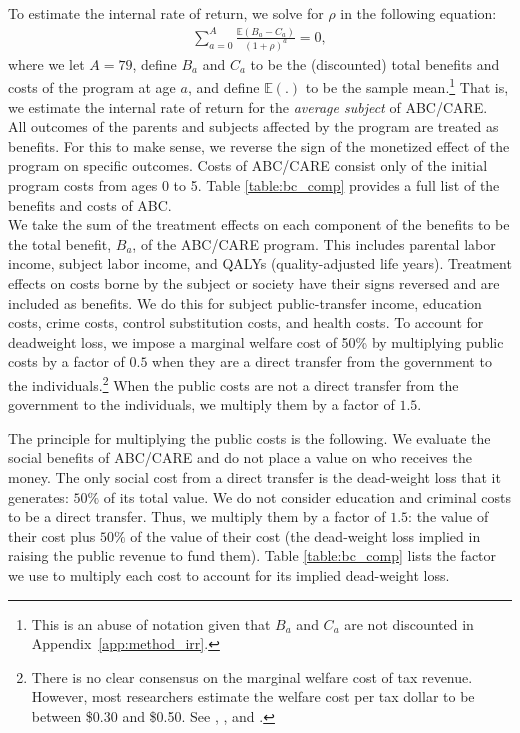 \noindent To estimate the internal rate of return, we solve for $\rho$ in the following equation:
\begin{align}
\sum_{a=0}^A \frac{ \mathbb{E} (B_a - C_a)}{(1+\rho)^a} = 0,
\end{align}
where we let $A = 79$, define $B_a$ and $C_a$ to be the (discounted) total benefits and costs of the program at age $a$, and define $\mathbb{E}(.)$ to be the sample mean.\footnote{This is an abuse of notation given that $B_a$ and $C_a$ are not discounted in Appendix~\ref{app:method_irr}.} That is, we estimate the internal rate of return for the \textit{average subject} of ABC/CARE. \\

\noindent All outcomes of the parents and subjects affected by the program are treated as benefits. For this to make sense, we reverse the sign of the monetized effect of the program on specific outcomes. Costs of ABC/CARE consist only of the initial program costs from ages 0 to 5. Table \ref{table:bc_comp} provides a full list of the benefits and costs of ABC. \\

\noindent We take the sum of the treatment effects on each component of the benefits to be the total benefit, $B_a$, of the ABC/CARE program. This includes parental labor income, subject labor income, and QALYs (quality-adjusted life years). Treatment effects on costs borne by the subject or society have their signs reversed and are included as benefits. We do this for subject public-transfer income, education costs, crime costs, control substitution costs, and health costs. To account for deadweight loss, we impose a marginal welfare cost of 50\% by multiplying public costs by a factor of $0.5$ when they are a direct transfer from the government to the individuals.\footnote{There is no clear consensus on the marginal welfare cost of tax revenue. However, most researchers estimate the welfare cost per tax dollar to be between \$0.30 and \$0.50. See \citet{Feldstein_1999_REStat}, \citet{Heckman_Smith_1998_evaluating}, and \citet{Browning_1987_AER}.} When the public costs are not a direct transfer from the government to the individuals, we multiply them by a factor of $1.5$.

\noindent The principle for multiplying the public costs is the following. We evaluate the social benefits of ABC/CARE and do not place a value on who receives the money. The only social cost from a direct transfer is the dead-weight loss that it generates: $50\%$ of its total value. We do not consider education and criminal costs to be a direct transfer. Thus, we multiply them by a factor of $1.5$: the value of their cost plus $50\%$ of the value of their cost (the dead-weight loss implied in raising the public revenue to fund them). Table \ref{table:bc_comp} lists the factor we use to multiply each cost to account for its implied dead-weight loss.

